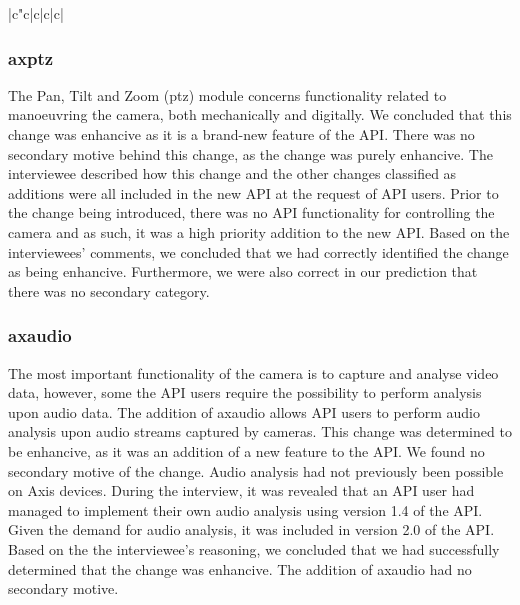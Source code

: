 \documentclass{sig-alternate}
\begin{document}
\begin{table}
\begin{tabular}[ht]{|c"c|c|c|c|}
       \end{tabular}
       \caption{Category }
       \label{table:Categories}
\end{table}



\subsubsection{axptz}
The Pan, Tilt and Zoom (ptz) module concerns functionality related to manoeuvring the camera, both mechanically and digitally. 
We concluded that this change was enhancive as it is a brand-new feature of the API. There was no secondary motive behind this change, as the change was purely enhancive. 
The interviewee described how this change and the other changes classified as additions were all included in the new API at the request of API users. Prior to the change being introduced, there was no API functionality for controlling the camera and as such, it was a high priority addition to the new API. 
Based on the interviewees' comments, we concluded that we had correctly identified the change as being enhancive. Furthermore, we were also correct in our prediction that there was no secondary category. 

\subsubsection{axaudio}
The most important functionality of the camera is to capture and analyse video data, however, some the API users require the possibility to perform analysis upon audio data. The addition of axaudio allows API users to perform audio analysis upon audio streams captured by cameras. 
This change was determined to be enhancive, as it was an addition of a new feature to the API. We found no secondary motive of the change. 
Audio analysis had not previously been possible on Axis devices. During the interview, it was revealed that an API user had managed to implement their own audio analysis using version 1.4 of the API. Given the demand for audio analysis, it was included in version 2.0 of the API.
Based on the the interviewee's reasoning, we concluded that we had successfully determined that the change was enhancive. The addition of axaudio had no secondary motive. 
\end{document}
